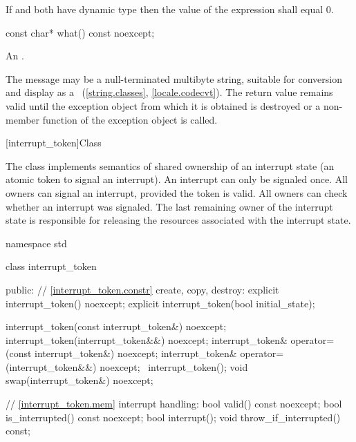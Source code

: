 {\begin{itemdescr}
  \pnum \postconditions If  and  both have dynamic type 
        then the value of the expression  shall equal 0.
\end{itemdescr}

%
\begin{itemdecl}
const char* what() const noexcept;
\end{itemdecl}

\begin{itemdescr}
\pnum
\returns
An  \ntbs{}.

\pnum
\remarks
The message may be a null-terminated multibyte string,
suitable for conversion and display as a
~(\ref{string.classes}, \ref{locale.codecvt}).
The return value remains valid until the exception object from which
it is obtained is destroyed or a non-
member function of the exception object is called.
\end{itemdescr}


%
[interrupt_token]{Class }

\pnum
{}%
The class  implements semantics of shared ownership of an
interrupt state (an atomic token to signal an interrupt).
An interrupt can only be signaled once.
All owners can signal an interrupt, provided the token is valid.
All owners can check whether an interrupt was signaled.
The last remaining owner of the interrupt state is responsible for 
releasing the resources associated with the interrupt state.

\begin{codeblock}
namespace std {
  class interrupt_token {
  public:
    // \ref{interrupt_token.constr} create, copy, destroy:
    explicit interrupt_token() noexcept;
    explicit interrupt_token(bool initial_state);

    interrupt_token(const interrupt_token&) noexcept;
    interrupt_token(interrupt_token&&) noexcept;
    interrupt_token& operator=(const interrupt_token&) noexcept;
    interrupt_token& operator=(interrupt_token&&) noexcept;
    ~interrupt_token();
    void swap(interrupt_token&) noexcept;

    // \ref{interrupt_token.mem} interrupt handling:
    bool valid() const noexcept;
    bool is_interrupted() const noexcept;
    bool interrupt();
    void throw_if_interrupted() const;
  }
}


\end{codeblock}}
